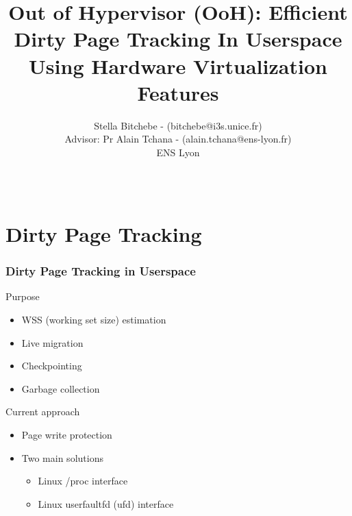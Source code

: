 \documentclass[xcolor=table,bigger,unknownkeysallowed]{beamer}
\title{Out of Hypervisor (OoH): Efficient Dirty Page Tracking In Userspace Using Hardware Virtualization Features}
\author{Stella Bitchebe - (bitchebe@i3s.unice.fr)\\
Advisor: Pr Alain Tchana - (alain.tchana@ens-lyon.fr) \\
ENS Lyon}
\date{~}
\institute{\vskip1ex Rennes - April, 29}
\begin{document}
\thispagestyle{empty}

\maketitle

\section{Dirty Page Tracking}
        \begin{frame}
        \frametitle{Dirty Page Tracking in Userspace} 
			\begin{block}{Purpose}
				\begin{itemize}
					\item WSS (working set size) estimation
					\item Live migration
					\item Checkpointing
					\item Garbage collection
				\end{itemize}
			\end{block}		
			
			\begin{block}{Current approach}
				\begin{itemize}
					\item Page write protection
					\item Two main solutions
					\begin{itemize}
						\item Linux /proc interface
						\item Linux userfaultfd (ufd) interface
					\end{itemize}
				\end{itemize}
			\end{block}	
        \end{frame}
\end{document}
